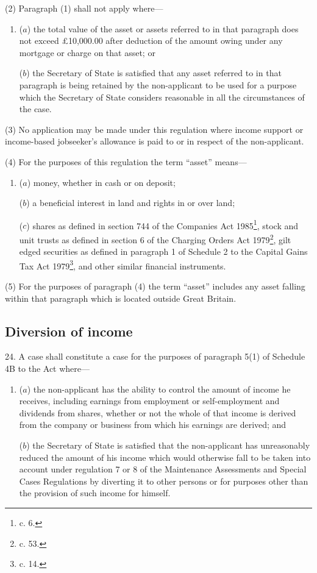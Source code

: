 \documentclass[a4paper]{article}
\begin{document}
(2) Paragraph (1) shall not apply where—
\begin{enumerate}\item[]
($a$) the total value of the asset or assets referred to in that paragraph does not
exceed £10,000.00 after deduction of the amount owing under any mortgage or
charge on that asset; or

($b$) the Secretary of State is satisfied that any asset referred to in that
paragraph is being retained by the non-applicant to be used for a purpose which
the Secretary of State considers reasonable in all the circumstances of the
case.
\end{enumerate}

(3) No application may be made under this regulation where income support or
income-based jobseeker’s allowance is paid to or in respect of the
non-applicant.

(4) For the purposes of this regulation the term “asset” means—
\begin{enumerate}\item[]
($a$) money, whether in cash or on deposit;

($b$) a beneficial interest in land and rights in or over land;

($c$) shares as defined in section 744 of the Companies Act 1985\footnote{ c. 6.}, stock and
unit trusts as defined in section 6 of the Charging Orders Act 1979\footnote{ c. 53.}, gilt
edged securities as defined in paragraph 1 of Schedule 2 to the Capital Gains
Tax Act 1979\footnote{ c. 14.}, and other similar financial instruments.
\end{enumerate}

(5) For the purposes of paragraph (4) the term “asset” includes any asset
falling within that paragraph which is located outside Great Britain.

\subsection[24. Diversion of income]{Diversion of income}

24. A case shall constitute a case for the purposes of
paragraph 5(1) of Schedule 4B to the Act where—
\begin{enumerate}\item[]
($a$) the non-applicant has the ability to control the amount of income he
receives, including earnings from employment or self-employment and dividends
from shares, whether or not the whole of that income is derived from the company
or business from which his earnings are derived; and

($b$) the Secretary of State is satisfied that the non-applicant has unreasonably
reduced the amount of his income which would otherwise fall to be taken into
account under regulation 7 or 8 of the Maintenance Assessments and Special Cases
Regulations by diverting it to other persons or for purposes other than the
provision of such income for himself.
\end{enumerate}
\end{document}
